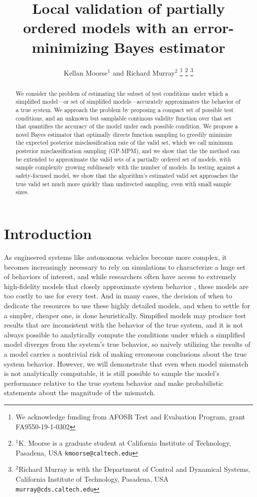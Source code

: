 \documentclass[letterpaper, 10 pt, conference]{ieeeconf}  %
\title{\LARGE \bf
Local validation of partially ordered models with an error-minimizing Bayes estimator
}
\author{Kellan Moorse$^{1}$ and Richard Murray$^{2}$%
\thanks{We acknowledge funding from AFOSR Test and Evaluation Program, grant FA9550-19-1-0302}%
\thanks{$^{1}$K. Moorse is a graduate student at California Institute of Technology,
Pasadena, USA
        {\tt\small kmoorse@caltech.edu}}%
\thanks{$^{2}$Richard Murray is with the Department of Control and Dynamical Systems, California Institute of Technology,
Pasadena, USA
        {\tt\small murray@cds.caltech.edu}}%
}
\begin{document}
\maketitle
\thispagestyle{empty}
\pagestyle{empty}


\begin{abstract}

We consider the problem of estimating the subset of test conditions under which a simplified model---or set of simplified models---accurately approximates the behavior of a true system. We approach the problem by proposing a compact set of possible test conditions, and an unknown but samplable continous validity function over that set that quantifies the accuracy of the model under each possible condition. We propose a novel Bayes estimator that optimally directs function sampling to greedily minimize the expected posterior misclassification rate of the valid set, which we call minimum posterior misclassification sampling (GP-MPM), and we show that the the method can be extended to approximate the valid sets of a partially ordered set of models, with sample complexity growing sublinearly with the number of models. In testing against a safety-focused model, we show that the algorithm's estimated valid set approaches the true valid set much more quickly than undirected sampling, even with small sample sizes.
\end{abstract}


\section{Introduction}

As engineered systems like autonomous vehicles become more complex, it becomes increasingly necessary to rely on simulations to characterize a huge set of behaviors of interest, and while researchers often have access to extremely high-fidelity models that closely approximate system behavior \cite{mcruer75, pearce62}, these models are too costly to use for every test. And in many cases, the decision of when to dedicate the resources to use these highly detailed models, and when to settle for a simpler, cheaper one, is done heuristically. Simpified models may produce test results that are inconsistent with the behavior of the true system, and it is not always possible to analytically compute the conditions under which a simplified model diverges from the system's true behavior, so naively utilizing the results of a model carries a nontrivial risk of making erroneous conclusions about the true system behavior. However, we will demonstrate that even when model mismatch is not analytically computable, it is still possible to sample the model's performance relative to the true system behavior and make probabilistic statements about the magnitude of the mismatch.
\newline
\end{document}

